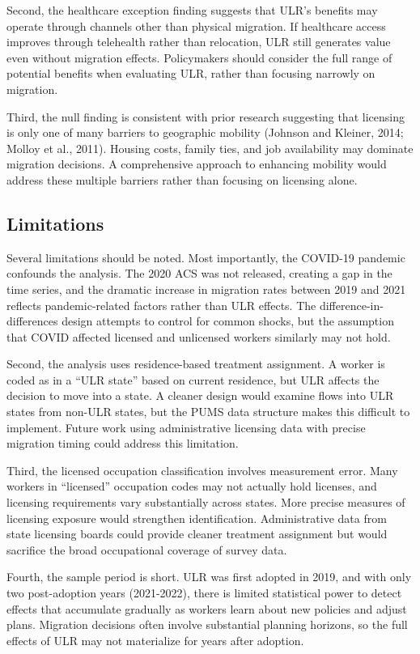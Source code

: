 \documentclass[12pt]{article}
\begin{document}
Second, the healthcare exception finding suggests that ULR's benefits may operate through channels other than physical migration. If healthcare access improves through telehealth rather than relocation, ULR still generates value even without migration effects. Policymakers should consider the full range of potential benefits when evaluating ULR, rather than focusing narrowly on migration.

Third, the null finding is consistent with prior research suggesting that licensing is only one of many barriers to geographic mobility (Johnson and Kleiner, 2014; Molloy et al., 2011). Housing costs, family ties, and job availability may dominate migration decisions. A comprehensive approach to enhancing mobility would address these multiple barriers rather than focusing on licensing alone.

\subsection{Limitations}

Several limitations should be noted. Most importantly, the COVID-19 pandemic confounds the analysis. The 2020 ACS was not released, creating a gap in the time series, and the dramatic increase in migration rates between 2019 and 2021 reflects pandemic-related factors rather than ULR effects. The difference-in-differences design attempts to control for common shocks, but the assumption that COVID affected licensed and unlicensed workers similarly may not hold.

Second, the analysis uses residence-based treatment assignment. A worker is coded as in a ``ULR state'' based on current residence, but ULR affects the decision to move into a state. A cleaner design would examine flows into ULR states from non-ULR states, but the PUMS data structure makes this difficult to implement. Future work using administrative licensing data with precise migration timing could address this limitation.

Third, the licensed occupation classification involves measurement error. Many workers in ``licensed'' occupation codes may not actually hold licenses, and licensing requirements vary substantially across states. More precise measures of licensing exposure would strengthen identification. Administrative data from state licensing boards could provide cleaner treatment assignment but would sacrifice the broad occupational coverage of survey data.

Fourth, the sample period is short. ULR was first adopted in 2019, and with only two post-adoption years (2021-2022), there is limited statistical power to detect effects that accumulate gradually as workers learn about new policies and adjust plans. Migration decisions often involve substantial planning horizons, so the full effects of ULR may not materialize for years after adoption.
\end{document}
